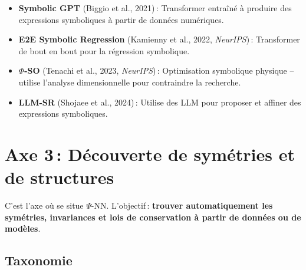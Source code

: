 \documentclass[11pt,a4paper]{article}
\begin{document}
\begin{itemize}[leftmargin=1.8em,itemsep=2pt]
\item \textbf{Symbolic GPT} (Biggio et al., 2021)\,: Transformer entraîné à produire des expressions symboliques à partir de données numériques.
\item \textbf{E2E Symbolic Regression} (Kamienny et al., 2022, \textit{NeurIPS})\,: Transformer de bout en bout pour la régression symbolique.
\item \textbf{$\Phi$-SO} (Tenachi et al., 2023, \textit{NeurIPS})\,: Optimisation symbolique physique -- utilise l'analyse dimensionnelle pour contraindre la recherche.
\item \textbf{LLM-SR} (Shojaee et al., 2024)\,: Utilise des LLM pour proposer et affiner des expressions symboliques.
\end{itemize}

\section{Axe 3\,: Découverte de symétries et de structures}

C'est l'axe où se situe $\Psi$-NN. L'objectif\,: \textbf{trouver automatiquement les symétries, invariances et lois de conservation à partir de données ou de modèles}.

\subsection{Taxonomie}
\end{document}
